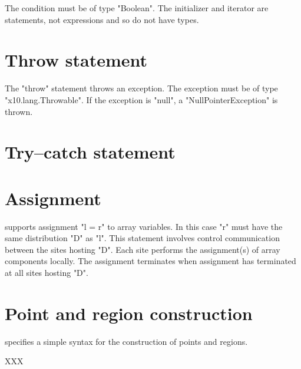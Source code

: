 The condition must be of type \xcd"Boolean".
The initializer and iterator are statements, not expressions
and so do not have types.

\section{Throw statement}

The \xcd"throw" statement throws an exception.  The exception
must be of type \xcd"x10.lang.Throwable".  If the exception is
\xcd"null", a \xcd"NullPointerException" is thrown.

\section{Try--catch statement}




\section{Assignment}\label{AssignmentStatement}

%

{}\Xten{} supports assignment \xcd"l = r" to array variables. In this
case \xcd"r" must have the same distribution \xcd"D" as \xcd"l". This
statement involves control communication between the sites hosting
\xcd"D". Each site performs the assignment(s) of array components
locally. The assignment terminates when assignment has terminated at
all sites hosting \xcd"D".



\section{Point and region construction}\label{point-syntax}
\Xten{} specifies a simple syntax for the construction of points and regions.

XXX


